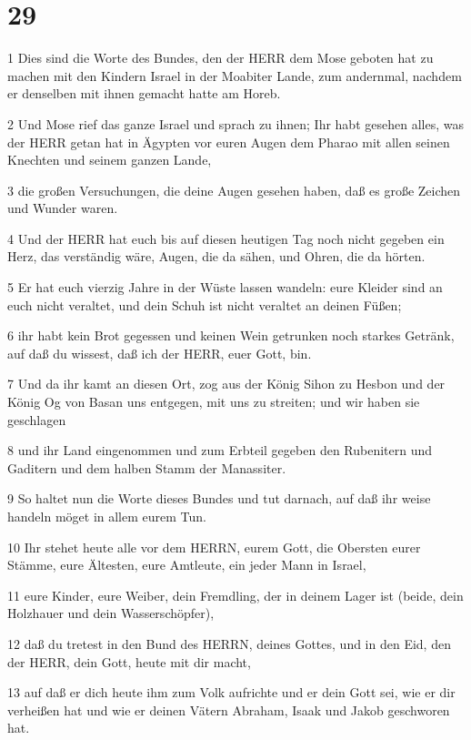 \chapter{29}

\par 1 Dies sind die Worte des Bundes, den der HERR dem Mose geboten hat zu machen mit den Kindern Israel in der Moabiter Lande, zum andernmal, nachdem er denselben mit ihnen gemacht hatte am Horeb.
\par 2 Und Mose rief das ganze Israel und sprach zu ihnen; Ihr habt gesehen alles, was der HERR getan hat in Ägypten vor euren Augen dem Pharao mit allen seinen Knechten und seinem ganzen Lande,
\par 3 die großen Versuchungen, die deine Augen gesehen haben, daß es große Zeichen und Wunder waren.
\par 4 Und der HERR hat euch bis auf diesen heutigen Tag noch nicht gegeben ein Herz, das verständig wäre, Augen, die da sähen, und Ohren, die da hörten.
\par 5 Er hat euch vierzig Jahre in der Wüste lassen wandeln: eure Kleider sind an euch nicht veraltet, und dein Schuh ist nicht veraltet an deinen Füßen;
\par 6 ihr habt kein Brot gegessen und keinen Wein getrunken noch starkes Getränk, auf daß du wissest, daß ich der HERR, euer Gott, bin.
\par 7 Und da ihr kamt an diesen Ort, zog aus der König Sihon zu Hesbon und der König Og von Basan uns entgegen, mit uns zu streiten; und wir haben sie geschlagen
\par 8 und ihr Land eingenommen und zum Erbteil gegeben den Rubenitern und Gaditern und dem halben Stamm der Manassiter.
\par 9 So haltet nun die Worte dieses Bundes und tut darnach, auf daß ihr weise handeln möget in allem eurem Tun.
\par 10 Ihr stehet heute alle vor dem HERRN, eurem Gott, die Obersten eurer Stämme, eure Ältesten, eure Amtleute, ein jeder Mann in Israel,
\par 11 eure Kinder, eure Weiber, dein Fremdling, der in deinem Lager ist (beide, dein Holzhauer und dein Wasserschöpfer),
\par 12 daß du tretest in den Bund des HERRN, deines Gottes, und in den Eid, den der HERR, dein Gott, heute mit dir macht,
\par 13 auf daß er dich heute ihm zum Volk aufrichte und er dein Gott sei, wie er dir verheißen hat und wie er deinen Vätern Abraham, Isaak und Jakob geschworen hat.
